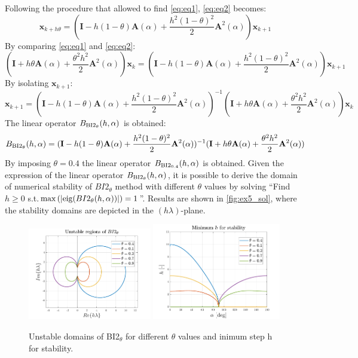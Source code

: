 \documentclass[11pt,a4paper,oneside]{article}
\renewcommand{\vec}[1]{\mathbf{#1}}
\begin{document}
Following the procedure that allowed to find \autoref{eq:eq1}, \autoref{eq:eq2} becomes:
\begin{equation}
    \vec{x}_{k+h\theta} = (\vec{I} - h(1-\theta)\vec{A}(\alpha) + \frac{h^2(1-\theta)^2}{2}\vec{A}^2(\alpha))\vec{x}_{k+1}
\end{equation}
By comparing \autoref{eq:eq1} and \autoref{eq:eq2}:
\begin{equation}
    (\vec{I} + h\theta\vec{A}(\alpha) + \frac{\theta^2h^2}{2}\vec{A}^2(\alpha))\vec{x}_k = (\vec{I} - h(1-\theta)\vec{A}(\alpha) + \frac{h^2(1-\theta)^2}{2}\vec{A}^2(\alpha))\vec{x}_{k+1}
\end{equation}
By isolating $\vec{x}_{k+1}$:
\begin{equation}
    \vec{x}_{k+1} = (\vec{I} - h(1-\theta)\vec{A}(\alpha) + \frac{h^2(1-\theta)^2}{2}\vec{A}^2(\alpha))^{-1}(\vec{I} + h\theta\vec{A}(\alpha) + \frac{\theta^2h^2}{2}\vec{A}^2(\alpha))\vec{x}_k
\end{equation}
The linear operator $B_{\rm BI2_{\theta}}(h,\alpha)$ is obtained:
\begin{equation}
    B_{\rm BI2_{\theta}}(h,\alpha) = (\vec{I} - h(1-\theta)\vec{A}(\alpha) + \frac{h^2(1-\theta)^2}{2}\vec{A}^2(\alpha))^{-1}(\vec{I} + h\theta\vec{A}(\alpha) + \frac{\theta^2h^2}{2}\vec{A}^2(\alpha))
\end{equation}
By imposing $\theta = 0.4$ the linear operator $B_{\rm BI2_{0.4}}(h,\alpha)$ is obtained.
Given the expression of the linear operator $B_{\rm BI2_{\theta}}(h,\alpha)$, it is possible 
to derive the domain of numerical stability of $BI2_{\theta}$ method with different $\theta$ 
values by solving ``Find $h\ge 0$ s.t.$\max\left(|{\rm eig}(BI2_{\theta}(h,\alpha))|\right) = 1$''.
 Results are shown in \autoref{fig:ex5_sol}, where the stability domains are depicted in the $(h\lambda)$-plane.

\begin{figure}[h]
    \centering
    \includegraphics[width=0.48\textwidth]{gfx/ex5_1.pdf}
    \includegraphics[width=0.50\textwidth]{gfx/ex5_2.pdf}
    \caption{Unstable domains of BI2$_{\theta}$ for different $\theta$ values and inimum step h for stability.}\label{fig:ex5_sol}
\end{figure}
\end{document}
